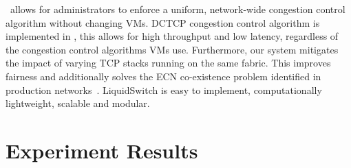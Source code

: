 ~\acdc allows for
administrators to enforce a uniform, network-wide congestion control algorithm without changing VMs. DCTCP congestion control algorithm is implemented in \acdc{}, this allows for high throughput and low latency, regardless of the congestion control algorithms VMs use. Furthermore,
our system mitigates the impact of varying TCP stacks running on the same fabric. This improves fairness and additionally
solves the ECN co-existence problem identified in production networks~\cite{wu2012tuning,judd2015nsdi}.
LiquidSwitch is easy to implement, computationally lightweight, scalable and modular.

\section{Experiment Results}
